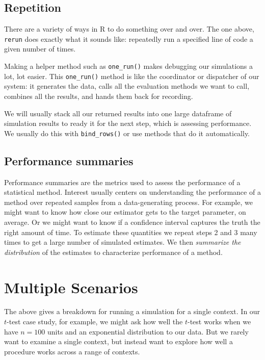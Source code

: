 \documentclass[
]{book}
\begin{document}
\hypertarget{repetition}{%
\subsection{Repetition}\label{repetition}}

There are a variety of ways in R to do something over and over.
The one above, \texttt{rerun} does exactly what it sounds like: repeatedly run a specified line of code a given number of times.

Making a helper method such as \texttt{one\_run()} makes debugging our simulations a lot, lot easier.
This \texttt{one\_run()} method is like the coordinator or dispatcher of our system: it generates the data, calls all the evaluation methods we want to call, combines all the results, and hands them back for recording.

We will usually stack all our returned results into one large dataframe of simulation results to ready it for the next step, which is assessing performance.
We usually do this with \texttt{bind\_rows()} or use methods that do it automatically.

\hypertarget{performance-summaries}{%
\subsection{Performance summaries}\label{performance-summaries}}

Performance summaries are the metrics used to assess the performance of a statistical method.
Interest usually centers on understanding the performance of a method over repeated samples from a data-generating process.
For example, we might want to know how close our estimator gets to the target parameter, on average.
Or we might want to know if a confidence interval captures the truth the right amount of time.
To estimate these quantities we repeat steps 2 and 3 many times to get a large number of simulated estimates.
We then \emph{summarize the distribution} of the estimates to characterize performance of a method.

\hypertarget{multiple-scenarios}{%
\section{Multiple Scenarios}\label{multiple-scenarios}}

The above gives a breakdown for running a simulation for a single context.
In our \(t\)-test case study, for example, we might ask how well the \(t\)-test works when we have \(n=100\) units and an exponential distribution to our data.
But we rarely want to examine a single context, but instead want to explore how well a procedure works across a range of contexts.
\end{document}
